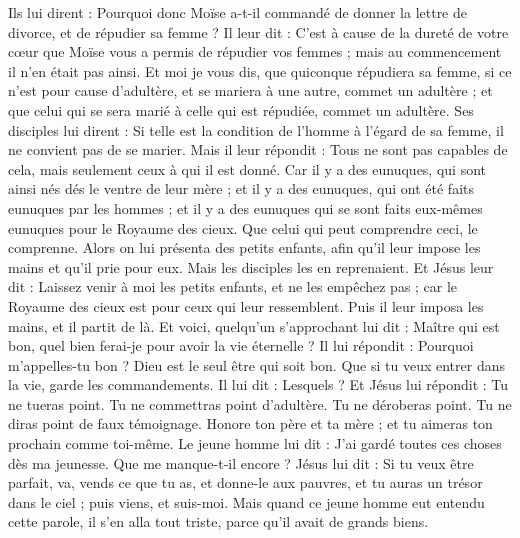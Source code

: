 \begin{multicols}{2}
Ils lui dirent : Pourquoi donc Moïse a-t-il commandé de donner la lettre de divorce, et de répudier sa femme ?
Il leur dit : C'est à cause de la dureté de votre cœur que Moïse vous a permis de répudier vos femmes ; mais au commencement il n'en était pas ainsi.
Et moi je vous dis, que quiconque répudiera sa femme, si ce n'est pour cause d'adultère, et se mariera à une autre, commet un adultère ; et que celui qui se sera marié à celle qui est répudiée, commet un adultère.
Ses disciples lui dirent : Si telle est la condition de l'homme à l'égard de sa femme, il ne convient pas de se marier.
Mais il leur répondit : Tous ne sont pas capables de cela, mais seulement ceux à qui il est donné.
Car il y a des eunuques, qui sont ainsi nés dés le ventre de leur mère ; et il y a des eunuques, qui ont été faits eunuques par les hommes ; et il y a des eunuques qui se sont faits eux-mêmes eunuques pour le Royaume des cieux. Que celui qui peut comprendre ceci, le comprenne.
Alors on lui présenta des petits enfants, afin qu'il leur impose les mains et qu'il prie pour eux. Mais les disciples les en reprenaient.
Et Jésus leur dit : Laissez venir à moi les petits enfants, et ne les empêchez pas ; car le Royaume des cieux est pour ceux qui leur ressemblent.
Puis il leur imposa les mains, et il partit de là.
Et voici, quelqu'un s'approchant lui dit : Maître qui est bon, quel bien ferai-je pour avoir la vie éternelle ?
Il lui répondit : Pourquoi m'appelles-tu bon ? Dieu est le seul être qui soit bon. Que si tu veux entrer dans la vie, garde les commandements.
Il lui dit : Lesquels ? Et Jésus lui répondit : Tu ne tueras point. Tu ne commettras point d'adultère. Tu ne déroberas point. Tu ne diras point de faux témoignage.
Honore ton père et ta mère ; et tu aimeras ton prochain comme toi-même.
Le jeune homme lui dit : J'ai gardé toutes ces choses dès ma jeunesse. Que me manque-t-il encore ?
Jésus lui dit : Si tu veux être parfait, va, vends ce que tu as, et donne-le aux pauvres, et tu auras un trésor dans le ciel ; puis viens, et suis-moi.
Mais quand ce jeune homme eut entendu cette parole, il s'en alla tout triste, parce qu'il avait de grands biens.

\end{multicols}
